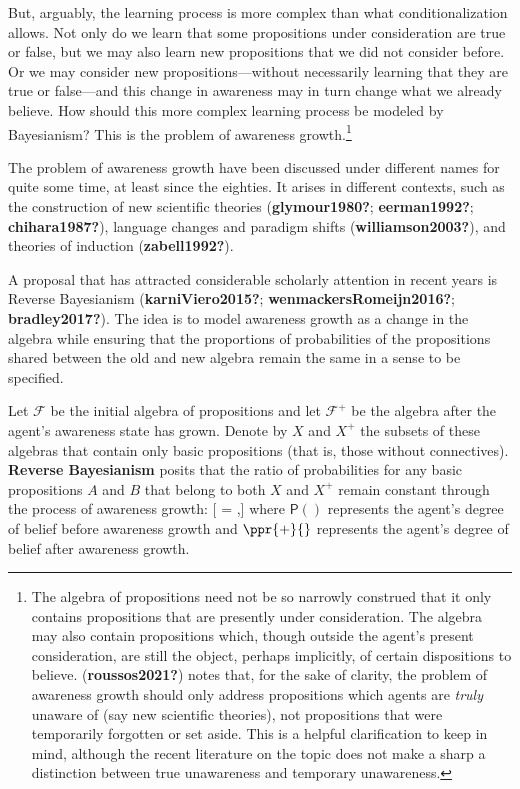 \documentclass[
  letterpaper,
  DIV=11,
  numbers=noendperiod]{scrartcl}
\newcommand{\pr}[1]{\mathsf{P}(#1)}
\begin{document}
But, arguably, the learning process is more complex than what
conditionalization allows. Not only do we learn that some propositions
under consideration are true or false, but we may also learn new
propositions that we did not consider before. Or we may consider new
propositions---without necessarily learning that they are true or
false---and this change in awareness may in turn change what we already
believe. How should this more complex learning process be modeled by
Bayesianism? This is the problem of awareness growth.\footnote{The
  algebra of propositions need not be so narrowly construed that it only
  contains propositions that are presently under consideration. The
  algebra may also contain propositions which, though outside the
  agent's present consideration, are still the object, perhaps
  implicitly, of certain dispositions to believe.
  (\textbf{roussos2021?}) notes that, for the sake of clarity, the
  problem of awareness growth should only address propositions which
  agents are \emph{truly} unaware of (say new scientific theories), not
  propositions that were temporarily forgotten or set aside. This is a
  helpful clarification to keep in mind, although the recent literature
  on the topic does not make a sharp a distinction between true
  unawareness and temporary unawareness.}

The problem of awareness growth have been discussed under different
names for quite some time, at least since the eighties. It arises in
different contexts, such as the construction of new scientific theories
(\textbf{glymour1980?}; \textbf{eerman1992?}; \textbf{chihara1987?}),
language changes and paradigm shifts (\textbf{williamson2003?}), and
theories of induction (\textbf{zabell1992?}).

A proposal that has attracted considerable scholarly attention in recent
years is Reverse Bayesianism (\textbf{karniViero2015?};
\textbf{wenmackersRomeijn2016?}; \textbf{bradley2017?}). The idea is to
model awareness growth as a change in the algebra while ensuring that
the proportions of probabilities of the propositions shared between the
old and new algebra remain the same in a sense to be specified.

Let \(\mathcal{F}\) be the initial algebra of propositions and let
\(\mathcal{F}^+\) be the algebra after the agent's awareness state has
grown. Denote by \(X\) and \(X^+\) the subsets of these algebras that
contain only basic propositions (that is, those without connectives).
\textbf{Reverse Bayesianism} posits that the ratio of probabilities for
any basic propositions \(A\) and \(B\) that belong to both \(X\) and
\(X^+\) remain constant through the process of awareness growth:
{[}\frac{\pr{A}}{\pr{B}} = ,{]} where
\(\pr{}\) represents the agent's degree of belief before awareness
growth and \(\ppr{+}{}\) represents the agent's degree of belief after
awareness growth.
\end{document}
